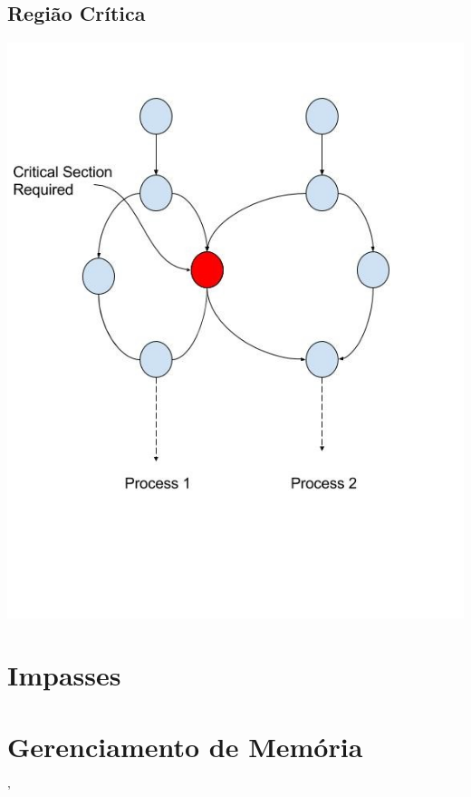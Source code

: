 \documentclass[ ]{article}
\begin{document}
		\subsection{Região Crítica}
		\includegraphics[scale=0.8]{images/critical_section.jpg}
	\section{Impasses}
	\section{Gerenciamento de Memória}'
\end{document}
